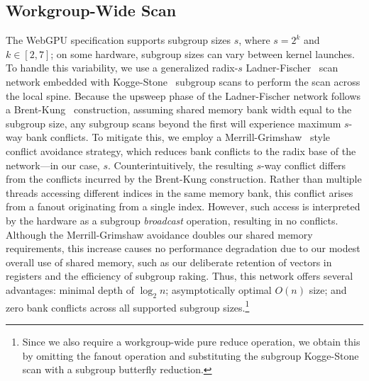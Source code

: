 \documentclass[sigconf]{acmart}
\begin{document}
\subsection{Workgroup-Wide Scan}
The WebGPU specification supports subgroup sizes $s$, where $s = 2^k$ and $k \in [2, 7]$; on some hardware, subgroup sizes can vary between kernel launches. To handle this variability, we use a generalized radix-$s$ Ladner-Fischer~\cite{10.1145/322217.322232} scan network embedded with Kogge-Stone~\cite{5009159} subgroup scans to perform the scan across the local spine. Because the upsweep phase of the Ladner-Fischer network follows a Brent-Kung~\cite{1675982} construction, assuming shared memory bank width equal to the subgroup size, any subgroup scans beyond the first will experience maximum $s$-way bank conflicts. To mitigate this, we employ a Merrill-Grimshaw~\cite[Section 3.3.5]{Merrill2009} style conflict avoidance strategy, which reduces bank conflicts to the radix base of the network—in our case, $s$. Counterintuitively, the resulting $s$-way conflict differs from the conflicts incurred by the Brent-Kung construction. Rather than multiple threads accessing different indices in the same memory bank, this conflict arises from a fanout originating from a single index. However, such access is interpreted by the hardware as a subgroup \emph{broadcast} operation, resulting in no conflicts. Although the Merrill-Grimshaw avoidance doubles our shared memory requirements, this increase causes no performance degradation due to our modest overall use of shared memory, such as our deliberate retention of vectors in registers and the efficiency of subgroup raking. Thus, this network offers several advantages: minimal depth of $\log_2 n$; asymptotically optimal $O(n)$ size; and zero bank conflicts across all supported subgroup sizes.\footnote{Since we also require a workgroup-wide pure reduce operation, we obtain this by omitting the fanout operation and substituting the subgroup Kogge-Stone scan with a subgroup butterfly reduction.}
\end{document}
